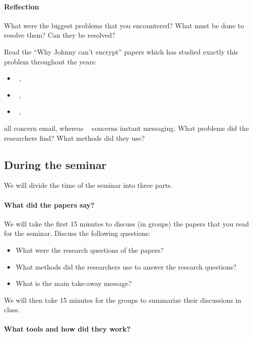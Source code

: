 \paragraph{Reflection}

What were the biggest problems that you encountered?
What must be done to resolve them?
Can they be resolved?

Read the \enquote{Why Johnny can't encrypt} papers which has studied exactly 
this problem throughout the years:
\begin{itemize}
  \item {}~\cite{WhyJohnnyCantEncrypt},
  \item {}~\cite{WhyJohnnyStillCantEncrypt},
  \item {}~\cite{WhyJohnnyStillStillCantEncrypt},
\end{itemize}
all concern email, whereas 
~\cite{CanJohnnyFinallyEncrypt} concerns 
instant messaging.
What problems did the researchers find?
What methods did they use?

\subsection{During the seminar}

We will divide the time of the seminar into three parts.

\paragraph{What did the papers say?}

We will take the first 15 minutes to discuss (in groups) the papers that you 
read for the seminar.
Discuss the following questions:
\begin{itemize}
  \item What were the research questions of the papers?
  \item What methods did the researchers use to answer the research questions?
  \item What is the main take-away message?
\end{itemize}

We will then take 15 minutes for the groups to summarize their discussions in 
class.

\paragraph{What tools and how did they work?}

